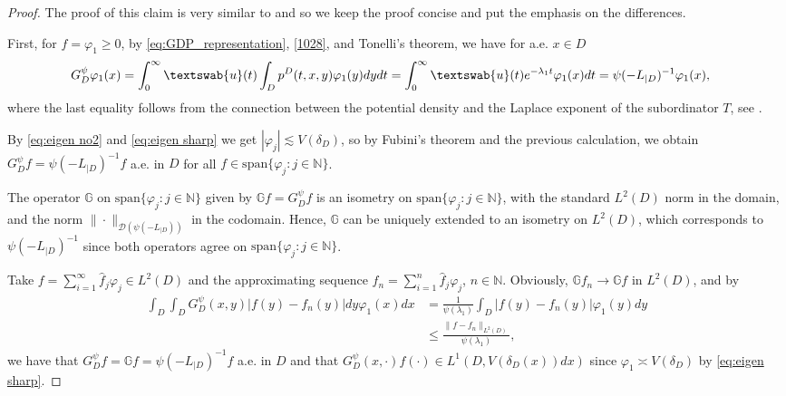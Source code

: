 \documentclass[12pt,a4paper,onecolumn]{article}
\theoremstyle{definition}
\newcommand{\N}{\mathbb{N}}
\newcommand{\G}{\mathds{G}}
\newcommand{\1}{\mathbf 1}
\newcommand{\de}{\delta_D}
\newcommand{\wh}{\widehat}
\newcommand{\LLL}{L^1(D,V(\de(x))dx)}
\newcommand{\DD}{\mathcal{D}}
\newcommand{\Lo}{\psi(-L_{|D})}
\newcommand{\LoInv}{\psi(-L_{|D})^{-1}}
\newcommand{\GDP}{G_D^\psi}
\newcommand{\uu}{\textswab{u}}
\numberwithin{equation}{section}
\begin{document}
    \begin{proof}
		The proof of this claim is very similar to \cite[Proposition 2.2]{Bio23cpaa} and \cite[Lemma 11]{AbaDup-Nonhomog2017} so we keep the proof concise and put the emphasis on the differences.
        
		First, for $f=\varphi_1\ge0$, by \eqref{eq:GDP_representation}, \eqref{1028}, and Tonelli's theorem,  we have for a.e. $x\in D$
		\begin{align*}
			\GDP\varphi_1(x)&=\int_0^\infty \uu(t)\int_D
			p^D(t,x,y)\varphi_1(y)dydt=\int_0^\infty \uu(t)e^{-\lambda_1
				t}\varphi_1(x)dt=\LoInv\varphi_1(x),
		\end{align*}
		where the last equality follows from the connection between the potential density and the Laplace exponent of the subordinator $T$, see \cite[Eq. (5.20)]{bernstein}.
		
        By \eqref{eq:eigen no2} and \eqref{eq:eigen sharp} we get $|\varphi_j|\lesssim V(\de)$, so by Fubini's theorem and the previous calculation, we obtain $\GDP f=\LoInv f$ a.e. in $D$ for all $f\in \textrm{span}\{\varphi_j:j\in \N\}$.

		The operator $\G$ on $\textrm{span}\{\varphi_j:j\in \N\}$ given by $\G f=\GDP f$ is an isometry on $\textrm{span}\{\varphi_j:j\in \N\}$, with the standard $L^2(D)$ norm in the domain, and the norm $\|\cdot\|_{\DD(\Lo)}$ in the codomain. Hence, $\G$ can be uniquely extended to an isometry on $L^2(D)$, which corresponds to $\LoInv$ since both operators agree on $\textrm{span}\{\varphi_j:j\in \N\}$.
        
        Take $f=\sum_{i=1}^\infty \wh f_j \varphi_j\in L^2(D)$ and the approximating sequence $f_n=\sum_{i=1}^n \wh f_j \varphi_j$, $n\in \N$. Obviously, $\G f_n \to \G f$ in $L^2(D)$, and by
        \begin{align*}
            \int_D\int_D \GDP(x,y)|f(y)-f_n(y)|dy\varphi_1(x)dx&=\frac{1}{\psi(\lambda_1)}\int_D|f(y)-f_n(y)|\varphi_1(y)dy\\
            &\le \frac{\| f-f_n\|_{L^2(D)}}{\psi(\lambda_1)},
        \end{align*}
        we have that $\GDP f = \G f =\LoInv f$ a.e. in $D$ and that $\GDP(x,\cdot)f(\cdot)\in \LLL$ since $\varphi_1\asymp V(\de)$ by \eqref{eq:eigen sharp}.
	\end{proof}
\end{document}
